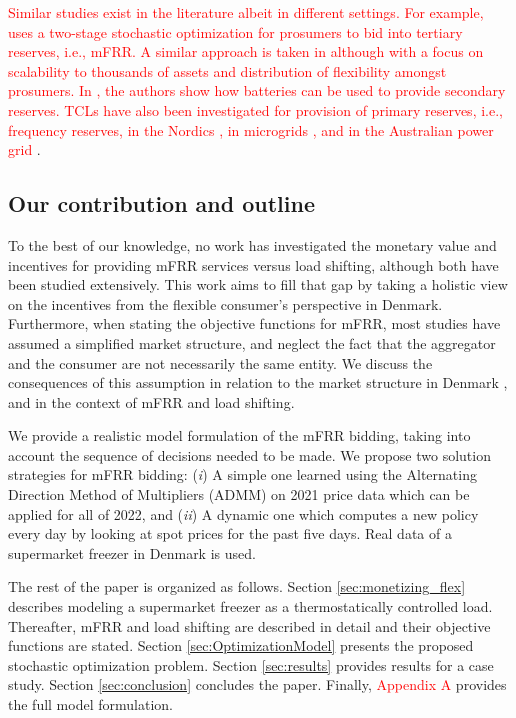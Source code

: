 \documentclass[11pt,a4paper]{article}
\begin{document}
\textcolor{red}{Similar studies exist in the literature albeit in different settings. For example, \cite{iria2018trading} uses a two-stage stochastic optimization for prosumers to bid into tertiary reserves, i.e., mFRR. A similar approach is taken in \cite{la2021mixed} although with a focus on scalability to thousands of assets and distribution of flexibility amongst prosumers. In \cite{nitsch2021economic}, the authors show how batteries can be used to provide secondary reserves. TCLs have also been investigated for provision of primary reserves, i.e., frequency reserves, in the Nordics \cite{paridari2020flexibility}, in microgrids \cite{mendieta2020primary}, and in the Australian power grid \cite{attarha2020network}}.

\subsection{Our contribution and outline}
%
To the best of our knowledge, no work has investigated the monetary value and incentives for providing mFRR services versus load shifting, although both have been studied extensively. This work aims to fill that gap by taking a holistic view on the incentives from the flexible consumer's perspective in Denmark. Furthermore, when stating the objective functions for mFRR, most studies have assumed a simplified market structure, and neglect the fact that the aggregator and the consumer are not necessarily the same entity. We discuss the consequences of this assumption in relation to the market structure in Denmark \cite{gade2022ecosystem}, and in the context of mFRR and load shifting.

We provide a realistic model formulation of the mFRR bidding, taking into account the sequence of decisions needed to be made. We propose two solution strategies for mFRR bidding: (\textit{i}) A simple one learned using the Alternating Direction Method of Multipliers (ADMM) on 2021 price data which can be applied for all of 2022, and (\textit{ii}) A dynamic one which computes a new policy every day by looking at spot prices for the past five days. Real data of a supermarket freezer  in Denmark is used.


The rest of the paper is organized as follows. Section \ref{sec:monetizing_flex} describes modeling a supermarket freezer as a thermostatically controlled load. Thereafter, mFRR and load shifting are described in detail and their objective functions are stated. Section \ref{sec:OptimizationModel} presents the proposed stochastic optimization problem.
Section \ref{sec:results} provides  results for a case study. Section \ref{sec:conclusion} concludes the paper. Finally, \textcolor{red}{Appendix A} provides the full model formulation.
\end{document}
